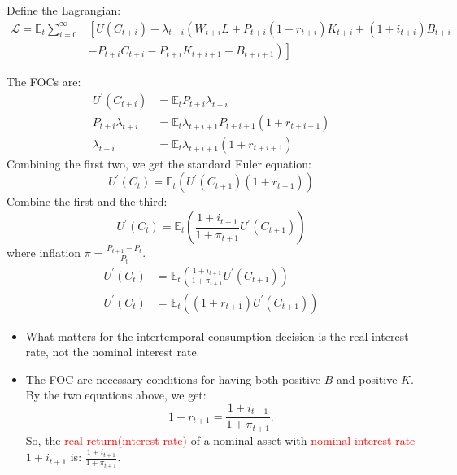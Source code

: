 Define the Lagrangian:
\begin{align*}
    \mathcal{L} =\mathbb{E}_t\sum_{i=0}^{\infty} & \left[ U(C_{t+i} ) + \lambda_{t+i} \left( W_{t+i}L + P_{t+i}(1+r_{t+i})K_{t+i} + (1+i_{t+i})B_{t+i} \right. \right. \\ 
    &- \left. \left. P_{t+i}C_{t+i} - P_{t+i}K_{t+i+1} - B_{t+i+1} \right) \right]
\end{align*}

The FOCs are:
\begin{align*}
    U^{\prime} (C_{t+i} ) &= \mathbb{E}_t P_{t+i}\lambda_{t+i}  \\
    P_{t+i}\lambda_{t+i} &= \mathbb{E}_t \lambda_{t+i+1} P_{t+i+1} (1+r_{t+i+1}) \\
    \lambda_{t+i} &= \mathbb{E}_t \lambda_{t+i+1} (1+r_{t+i+1})
\end{align*}
Combining the first two, we get the standard Euler equation:
\[
    U^{\prime} (C_{t} ) = \mathbb{E}_t \left(U^{\prime} (C_{t+1} ) (1+r_{t+1})\right)
\]
Combine the first and the third:
\[
    U^{\prime} (C_{t} ) = \mathbb{E}_t \left(\frac{1+i_{t+1}}{1+\pi_{t+1}} U^{\prime} (C_{t+1} )\right)
\]
where inflation $\pi = \frac{P_{t+1} - P_t}{P_t}$.
\begin{align*}
    U^{\prime} (C_{t} ) &= \mathbb{E}_t \left(\frac{1+i_{t+1}}{1+\pi_{t+1}} U^{\prime} (C_{t+1} )\right) \\
    U^{\prime} (C_{t} ) &= \mathbb{E}_t \left((1+r_{t+1}) U^{\prime} (C_{t+1} )\right)
\end{align*}
 
\begin{itemize}
    \item What matters for the intertemporal consumption decision is
    the real interest rate, not the nominal interest rate.
    \item The FOC are necessary conditions for having both positive $B$
    and positive $K$. By the two equations above, we get:
    \[1+r_{t+1} = \frac{1+i_{t+1}}{1+\pi_{t+1}}. \]
    So, the \textcolor{red}{real return(interest rate)} of a nominal asset
    with \textcolor{red}{nominal interest rate} $1+i_{t+1} $ is: $\frac{1+i_{t+1} }{1+\pi_{t+1}}$.
\end{itemize}

